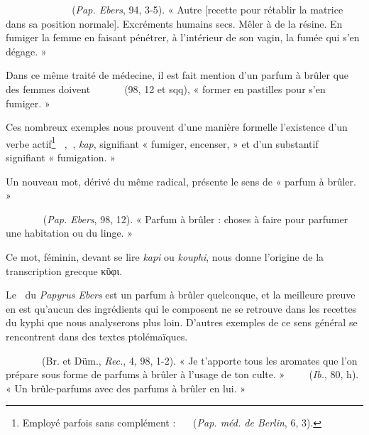 \documentclass[a4paper, 11pt, oneside]{article}
\newcommand*\hieroAAAA{\raisebox{0.8ex}{}}
\newcommand*\hieroAAAB{}
\newcommand*\hieroAAAC{\raisebox{0.6ex}{}}
\newcommand*\hieroAAAD{}
\newcommand*\hieroAAAH{}
\newcommand*\hieroAAAI{}
\newcommand*\hieroAAAL{}
\newcommand*\hieroAAAM{}
\newcommand*\hieroAAAN{}
\newcommand*\hieroAAAO{}
\newcommand*\hieroAAAR{}
\newcommand*\hieroAAAT{}
\newcommand*\hieroAABK{}
\newcommand*\hieroAABV{}
\newcommand*\hieroAABX{}
\newcommand*\hieroAABZ{}
\newcommand*\hieroAACA{}
\newcommand*\hieroAACB{}
\newcommand*\hieroAACE{}
\newcommand*\hieroAACK{\raisebox{0.5ex}{}}
\newcommand*\hieroAACL{}
\newcommand*\hieroAACM{}
\newcommand*\hieroAACN{}
\newcommand*\hieroAACO{}
\newcommand*\hieroAACP{}
\newcommand*\hieroAACQ{}
\newcommand*\hieroAACR{}
\newcommand*\hieroAACS{}
\newcommand*\hieroAACT{}
\newcommand*\hieroAACU{}
\newcommand*\hieroAACV{}
\newcommand*\hieroAACW{\raisebox{0.3ex}{}}
\newcommand*\hieroAACX{}
\newcommand*\hieroAACY{}
\newcommand*\hieroAACZ{}
\newcommand*\hieroAADA{}
\newcommand*\hieroAADB{}
\newcommand*\hieroAADC{}
\newcommand*\hieroAADD{\raisebox{0.9ex}{}}
\newcommand*\hieroAADE{}
\newcommand*\hieroAADF{}
\newcommand*\hieroAADG{}
\newcommand*\hieroAADH{}
\newcommand*\hieroAADI{}
\newcommand*\hieroAADJ{}
\newcommand*\hieroAADK{}
\newcommand*\hieroAADL{}
\newcommand*\hieroAADM{\raisebox{0.5ex}{}}
\newcommand*\hieroAADN{}
\newcommand*\hieroAADO{}
\newcommand*\hieroAADP{}
\newcommand*\hieroAADQ{}
\newcommand*\hieroAADR{}
\newcommand*\hieroAADS{}
\newcommand*\hieroAADT{}
\newcommand*\hieroAADU{}
\newcommand*\hieroAADV{}
\newcommand*\hieroAADW{}
\newcommand*\hieroAADX{}
\newcommand*\hieroAADY{}
\newcommand*\hieroAADZ{}
\newcommand*\hieroAAEA{}
\newcommand*\hieroAAEB{}
\newcommand*\hieroAAEC{}
\newcommand*\hieroAAED{}
\newcommand*\hieroAAEE{}
\newcommand*\hieroAAEF{}
\begin{document}
$\hieroAABK\:\hieroAACK\:\hieroAACL\:\hieroAACE\:\hieroAACM\:\hieroAACN\:\hieroAACO\:\hieroAACP\:\hieroAACQ\:\hieroAACR\:\hieroAAAI\:\hieroAACS\:\hieroAACT\:\hieroAAAD\:\hieroAACU\:\hieroAACV\:\hieroAACR\:\hieroAAAH\:\hieroAACQ\:\hieroAACW\:\hieroAACX\:\hieroAAAT\:\hieroAACY\:\hieroAACA\:\hieroAAAM\:\hieroAACZ\:\hieroAADA\:\hieroAADB\:\hieroAADC$ (\emph{Pap. Ebers}, 94, 3-5). « Autre [recette pour rétablir la matrice dans sa position normale]. Excréments humains secs. Mêler à de la résine. En fumiger la femme en faisant pénétrer, à l'intérieur de son vagin, la fumée qui s'en dégage. »

Dans ce même traité de médecine, il est fait mention d'un parfum à brûler que des femmes doivent $\hieroAADD\:\hieroAAAN\:\hieroAAAM\:\hieroAADE\:\hieroAAAL\:\hieroAABX\:\hieroAAAD\:\hieroAACA\:\hieroAADF\:\hieroAADG\:\hieroAAAM\:\hieroAAAN\:\hieroAADG$ (98, 12 et sqq), « former en pastilles pour s'en fumiger. »

Ces nombreux exemples nous prouvent d'une manière formelle l'existence d'un verbe actif\footnote{Employé parfois sans complément : $\hieroAACQ\:\hieroAAAN\:\hieroAABZ\:\hieroAACA\:\hieroAACB\:\hieroAACA$ (\emph{Pap. méd. de Berlin}, 6, 3).} $\hieroAAAA\:\hieroAAAB\:\hieroAAAO$, $\hieroAAAD\:\hieroAACA$, \emph{kap}, signifiant « fumiger, encenser, » et d'un substantif $\hieroAACB\:\hieroAACA$ signifiant « fumigation. » 

Un nouveau mot, dérivé du même radical, présente le sens de « parfum à brûler. »

$\hieroAADH\:\hieroAACA\:\hieroAADI\:\hieroAADJ\:\hieroAAAH\:\hieroAADK\:\hieroAAAN\:\hieroAADL\:\hieroAAAH\:\hieroAACY\:\hieroAADM\:\hieroAADN\:\hieroAADO\:\hieroAADP\:\hieroAAAC\:\hieroAAAL$ (\emph{Pap. Ebers}, 98, 12). « Parfum à brûler : choses à faire pour parfumer une habitation ou du linge. »

Ce mot, féminin, devant se lire \emph{kapi} ou \emph{kouphi}, nous donne l'origine de la transcription grecque κῦφι.

Le $\hieroAADH\:\hieroAACA$ du \emph{Papyrus Ebers} est un parfum à brûler quelconque, et la meilleure preuve en est qu'aucun des ingrédients qui le composent ne se retrouve dans les recettes du kyphi que nous analyserons plus loin. D'autres exemples de ce sens général se rencontrent dans des textes ptolémaïques.

$\hieroAADQ\:\hieroAADR\:\hieroAADS\:\hieroAADT\:\hieroAAAR\:\hieroAADU\:\hieroAADV\:\hieroAACA\:\hieroAADW\:\hieroAAAR\:\hieroAADX\:\hieroAAAI\:\hieroAADY\:\hieroAADZ\:\hieroAAEA\:\hieroAAEB$ (Br. et Düm., \emph{Rec.}, 4, 98, 1-2). « Je t'apporte tous les aromates que l'on prépare sous forme de parfums à brûler à l'usage de ton culte. » $\hieroAAEC\:\hieroAAAR\:\hieroAAED\:\hieroAAEE\:\hieroAAAR\:\hieroAAEE\:\hieroAAAR\:\hieroAABV\:\hieroAAEF$ (\emph{Ib.}, 80, h). « Un brûle-parfums avec des parfums à brûler en lui. »
\end{document}

